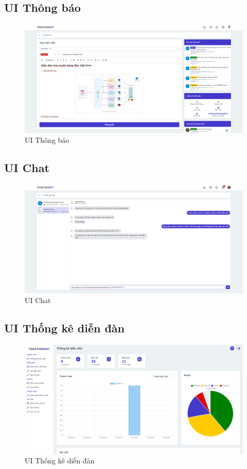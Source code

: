 \documentclass[../index.tex]{subfiles}
\begin{document}
    \subsection{UI Thông báo}
    \begin{figure}[H]
        \centering
        \includegraphics[width=1\linewidth]{figures/demo/create-post-page.png}
        \caption{UI Thông báo}
    \end{figure}

    \subsection{UI Chat}
    \begin{figure}[H]
        \centering
        \includegraphics[width=1\linewidth]{figures/demo/chat-page.png}
        \caption{UI Chat}
    \end{figure}

    \subsection{UI Thống kê diễn đàn}
    \begin{figure}[H]
        \centering
        \includegraphics[width=1\linewidth]{figures/demo/management-dashboard-page.png}
        \caption{UI Thống kê diễn đàn}
    \end{figure}
\end{document}
